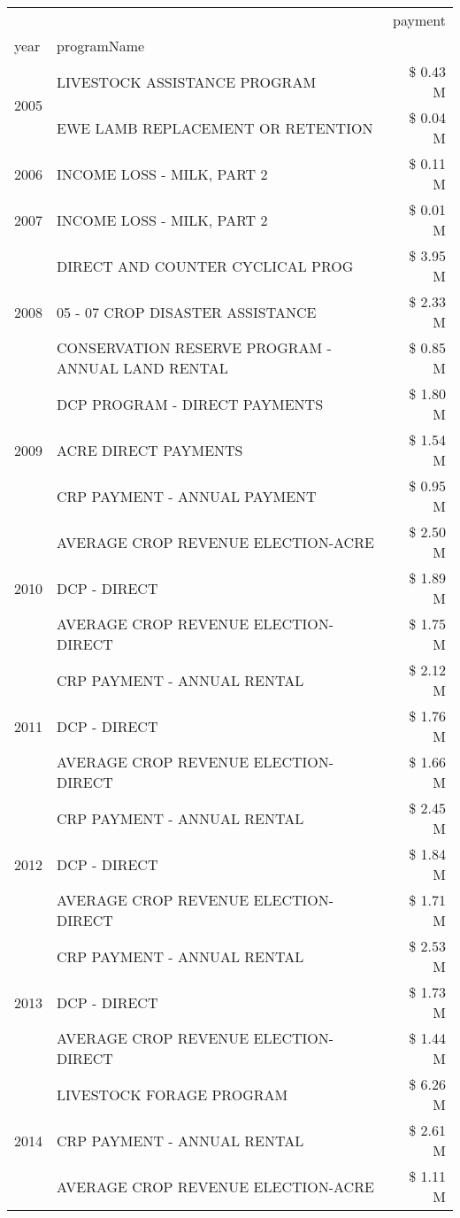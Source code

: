 \begin{tabular}{llr}
\toprule
 &  & payment \\
year & programName &  \\
\midrule
\multirow[t]{2}{*}{2005} & LIVESTOCK ASSISTANCE PROGRAM & \$ 0.43 M \\
 & EWE LAMB REPLACEMENT OR RETENTION & \$ 0.04 M \\
\cline{1-3}
2006 & INCOME LOSS - MILK, PART 2 & \$ 0.11 M \\
\cline{1-3}
2007 & INCOME LOSS - MILK, PART 2 & \$ 0.01 M \\
\cline{1-3}
\multirow[t]{3}{*}{2008} & DIRECT AND COUNTER CYCLICAL PROG & \$ 3.95 M \\
 & 05 - 07 CROP DISASTER ASSISTANCE & \$ 2.33 M \\
 & CONSERVATION RESERVE PROGRAM - ANNUAL LAND RENTAL & \$ 0.85 M \\
\cline{1-3}
\multirow[t]{3}{*}{2009} & DCP PROGRAM - DIRECT PAYMENTS & \$ 1.80 M \\
 & ACRE DIRECT PAYMENTS & \$ 1.54 M \\
 & CRP PAYMENT - ANNUAL PAYMENT & \$ 0.95 M \\
\cline{1-3}
\multirow[t]{3}{*}{2010} & AVERAGE CROP REVENUE ELECTION-ACRE & \$ 2.50 M \\
 & DCP - DIRECT & \$ 1.89 M \\
 & AVERAGE CROP REVENUE ELECTION-DIRECT & \$ 1.75 M \\
\cline{1-3}
\multirow[t]{3}{*}{2011} & CRP PAYMENT - ANNUAL RENTAL & \$ 2.12 M \\
 & DCP - DIRECT & \$ 1.76 M \\
 & AVERAGE CROP REVENUE ELECTION-DIRECT & \$ 1.66 M \\
\cline{1-3}
\multirow[t]{3}{*}{2012} & CRP PAYMENT - ANNUAL RENTAL & \$ 2.45 M \\
 & DCP - DIRECT & \$ 1.84 M \\
 & AVERAGE CROP REVENUE ELECTION-DIRECT & \$ 1.71 M \\
\cline{1-3}
\multirow[t]{3}{*}{2013} & CRP PAYMENT - ANNUAL RENTAL & \$ 2.53 M \\
 & DCP - DIRECT & \$ 1.73 M \\
 & AVERAGE CROP REVENUE ELECTION-DIRECT & \$ 1.44 M \\
\cline{1-3}
\multirow[t]{3}{*}{2014} & LIVESTOCK FORAGE PROGRAM & \$ 6.26 M \\
 & CRP PAYMENT - ANNUAL RENTAL & \$ 2.61 M \\
 & AVERAGE CROP REVENUE ELECTION-ACRE & \$ 1.11 M \\

\end{tabular}
